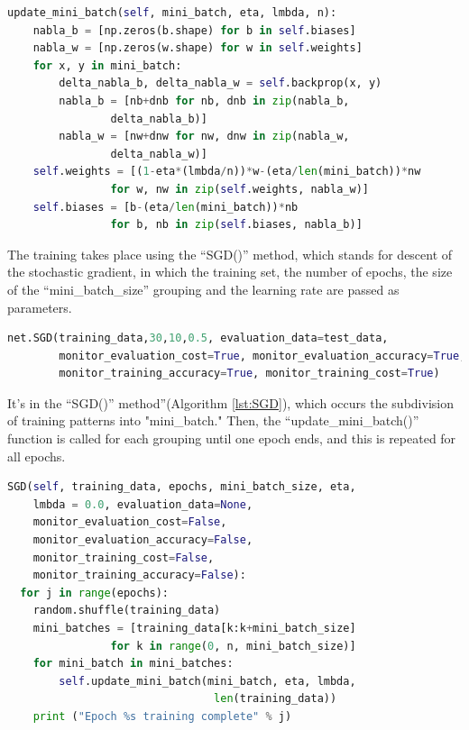 \begin{lstlisting}[caption={update\_mini\_batch() method in Python},label={lst:batch},language=Python]
update_mini_batch(self, mini_batch, eta, lmbda, n):
    nabla_b = [np.zeros(b.shape) for b in self.biases]
    nabla_w = [np.zeros(w.shape) for w in self.weights]
    for x, y in mini_batch:
        delta_nabla_b, delta_nabla_w = self.backprop(x, y)
        nabla_b = [nb+dnb for nb, dnb in zip(nabla_b, 
                delta_nabla_b)]
        nabla_w = [nw+dnw for nw, dnw in zip(nabla_w, 
                delta_nabla_w)]
    self.weights = [(1-eta*(lmbda/n))*w-(eta/len(mini_batch))*nw
                for w, nw in zip(self.weights, nabla_w)]
    self.biases = [b-(eta/len(mini_batch))*nb
                for b, nb in zip(self.biases, nabla_b)]
\end{lstlisting}

The training takes place using the “SGD()” method, which stands for descent of the stochastic gradient, in which the training set, the number of epochs, the size of the “mini\_batch\_size” grouping and the learning rate are passed as parameters.

\begin{lstlisting}[caption={SGD call in Python},label={lst:sgd},language=Python]
net.SGD(training_data,30,10,0.5, evaluation_data=test_data,
        monitor_evaluation_cost=True, monitor_evaluation_accuracy=True,
        monitor_training_accuracy=True, monitor_training_cost=True)
\end{lstlisting}

It's in the “SGD()” method”(Algorithm \ref{lst:SGD}), which occurs the subdivision of training patterns into "mini\_batch." Then, the “update\_mini\_batch()” function is called for each grouping until one epoch ends, and this is repeated for all epochs.

\begin{lstlisting}[caption={SGD method in Python},label={lst:SGD},language=Python]
SGD(self, training_data, epochs, mini_batch_size, eta,
    lmbda = 0.0, evaluation_data=None, 
    monitor_evaluation_cost=False, 
    monitor_evaluation_accuracy=False,
    monitor_training_cost=False, 
    monitor_training_accuracy=False):
  for j in range(epochs):
    random.shuffle(training_data)
    mini_batches = [training_data[k:k+mini_batch_size] 
                for k in range(0, n, mini_batch_size)]
    for mini_batch in mini_batches:
        self.update_mini_batch(mini_batch, eta, lmbda,
                                len(training_data))
    print ("Epoch %s training complete" % j)
\end{lstlisting}

